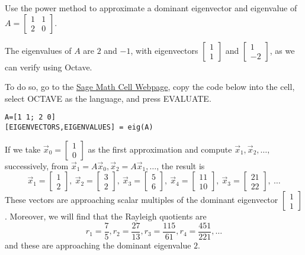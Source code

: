 \documentclass{ximera}
\begin{document}
\begin{exploration}\label{exp:2x2PowerMethod}
Use the power method to approximate a dominant eigenvector and eigenvalue of $A = \left[ \begin{array}{rr}
1 & 1 \\
2 & 0
\end{array}\right]$.

The eigenvalues of $A$ are $2$ and $-1$, with eigenvectors $\left[ \begin{array}{rr}
  1 \\
  1
  \end{array}\right]$ and $\left[ \begin{array}{rr}
  1 \\
  -2
  \end{array}\right]$, as we can verify using Octave. 
  
To do so, go to the \href{https://sagecell.sagemath.org/}{Sage Math Cell Webpage}, copy the code below into the cell, select OCTAVE as the language, and press EVALUATE.

\begin{verbatim}
A=[1 1; 2 0]
[EIGENVECTORS,EIGENVALUES] = eig(A)
\end{verbatim}

  
If we take $\vec{x}_{0} = \left[ \begin{array}{rr}
  1 \\
  0
  \end{array}\right]$ as the first approximation and compute $\vec{x}_{1}, \vec{x}_{2}, \dots,$ successively, from $\vec{x}_{1} = A\vec{x}_{0}, \vec{x}_{2} = A\vec{x}_{1}, \dots$, the result is
\begin{equation*}
\vec{x}_{1} = \left[ \begin{array}{rr}
1 \\
2
\end{array}\right], \
\vec{x}_{2} = \left[ \begin{array}{rr}
3 \\
2
\end{array}\right], \
\vec{x}_{3} = \left[ \begin{array}{rr}
5 \\
6
\end{array}\right], \
\vec{x}_{4} = \left[ \begin{array}{rr}
11 \\
10
\end{array}\right], \
\vec{x}_{3} = \left[ \begin{array}{rr}
21 \\
22
\end{array}\right], \ \dots
\end{equation*}
These vectors are approaching scalar multiples of the dominant eigenvector $\left[ \begin{array}{rr}
1 \\
1
\end{array}\right]$. Moreover, we will find that the Rayleigh quotients are
\begin{equation*}
r_{1} = \frac{7}{5}, r_{2} = \frac{27}{13}, r_{3} = \frac{115}{61}, r_{4} = \frac{451}{221}, \dots
\end{equation*}
and these are approaching the dominant eigenvalue $2$.


\end{exploration}
\end{document}
